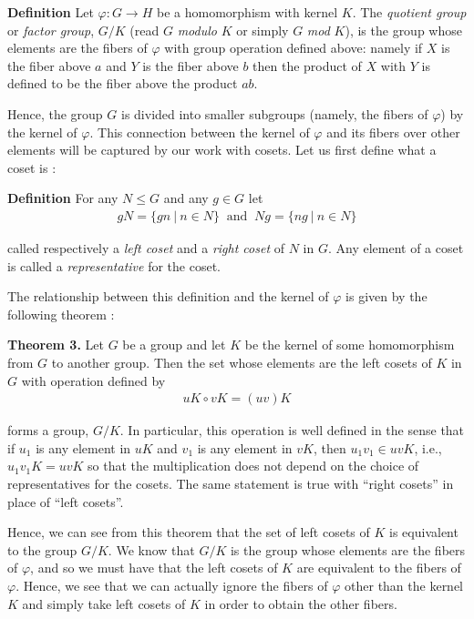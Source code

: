 \documentclass[11pt, reqno]{amsart}
\theoremstyle{plain}
\theoremstyle{definition}
\theoremstyle{example}
\begin{document}
\par
\textbf{Definition} Let $\varphi: G \to H$ be a homomorphism with kernel $K$. The \textit{quotient group} or \textit{factor group}, $G/K$ (read $G$ \textit{modulo} $K$ or simply $G$ \textit{mod} $K$), is the group whose elements are the fibers of $\varphi$ with group operation defined above: namely if $X$ is the fiber above $a$ and $Y$ is the fiber above $b$ then the product of $X$ with $Y$ is defined to be the fiber above the product $ab$.

\par
Hence, the group $G$ is divided into smaller subgroups (namely, the fibers of $\varphi$) by the kernel of $\varphi$. This connection between the kernel of $\varphi$ and its fibers over other elements will be captured by our work with cosets. Let us first define what a coset is \cite[\S 3.1, p. 77]{dummit}:

\par
\textbf{Definition} For any $N \le G$ and any $g \in G$ let
\begin{align*}
gN = \{gn \ | \ n \in N\} \;\; \text{and} \;\; Ng = \{ng \ | \ n \in N\}
\end{align*}

called respectively a \textit{left coset} and a \textit{right coset} of $N$ in $G$. Any element of a coset is called a \textit{representative} for the coset. 

\par
The relationship between this definition and the kernel of $\varphi$ is given by the following theorem \cite[\S 3.1, p. 77]{dummit}:

\par
\textbf{Theorem 3.} Let $G$ be a group and let $K$ be the kernel of some homomorphism from $G$ to another group. Then the set whose elements are the left cosets of $K$ in $G$ with operation defined by
\begin{align*}
uK \circ vK = (uv)K
\end{align*}

forms a group, $G/K$. In particular, this operation is well defined in the sense that if $u_1$ is any element in $uK$ and $v_1$ is any element in $vK$, then $u_1v_1 \in uvK$, i.e., $u_1v_1K = uvK$ so that the multiplication does not depend on the choice of representatives for the cosets. The same statement is true with ``right cosets'' in place of ``left cosets''.

\par
Hence, we can see from this theorem that the set of left cosets of $K$ is equivalent to the group $G/K$. We know that $G/K$ is the group whose elements are the fibers of $\varphi$, and so we must have that the left cosets of $K$ are equivalent to the fibers of $\varphi$. Hence, we see that we can actually ignore the fibers of $\varphi$ other than the kernel $K$ and simply take left cosets of $K$ in order to obtain the other fibers.
\end{document}
